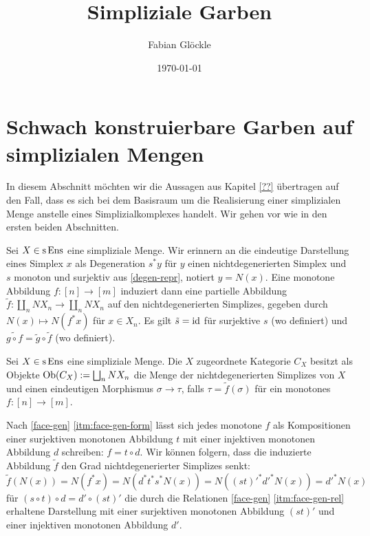 



\title{Simpliziale Garben}
\author{Fabian Glöckle}
\date{\today}

\section{Schwach konstruierbare Garben auf simplizialen Mengen}

In diesem Abschnitt möchten wir die Aussagen aus Kapitel \ref{??}
übertragen auf den Fall, dass es sich bei dem Basisraum um die
Realisierung einer simplizialen Menge anstelle eines
Simplizialkomplexes handelt. Wir gehen vor wie in den ersten beiden
Abschnitten.

Sei $X \in \operatorname{s}\operatorname{Ens}$ eine simpliziale Menge. Wir erinnern an die
eindeutige Darstellung eines Simplex $x$ als Degeneration $s^* y$ für
$y$ einen nichtdegenerierten Simplex und $s$ monoton und surjektiv aus
\ref{degen-repr}, notiert $y = N(x)$. Eine monotone Abbildung $f: [n]
\to [m]$ induziert dann eine partielle Abbildung $\tilde{f}: \coprod_n
NX_n \to \coprod_n NX_n$ auf den nichtdegenerierten Simplizes, gegeben
durch $N(x) \mapsto N(f^* x)$ für $x \in X_n$. Es gilt $\tilde{s} =
\operatorname{id}$ für surjektive $s$ (wo definiert) und $\tilde{g \circ f} =
\tilde{g} \circ \tilde{f}$ (wo definiert).
\begin{defn}
  Sei $X \in \operatorname{s}\operatorname{Ens}$ eine simpliziale Menge. Die $X$ zugeordnete
  Kategorie $C_X$ besitzt als Objekte $\operatorname{Ob}(C_X) := \bigsqcup_n NX_n$ die
  Menge der nichtdegenerierten Simplizes von $X$ und einen eindeutigen
  Morphismus $\sigma \to \tau$, falls $\tau = \tilde{f}(\sigma)$ für
  ein monotones $f: [n] \to [m]$.
\end{defn}
Nach \ref{face-gen} \ref{itm:face-gen-form} lässt sich jedes monotone
$f$ als Kompositionen einer surjektiven monotonen Abbildung $t$ mit
einer injektiven monotonen Abbildung $d$ schreiben: $f = t \circ
d$. Wir können folgern, dass die induzierte Abbildung $\tilde{f}$ den
Grad nichtdegenerierter Simplizes senkt: $\tilde{f}(N(x)) = N(f^* x) =
N(d^* t^* s^* N(x)) = N((st)'^* d'^* N(x)) = d'^* N(x)$ für $(s \circ
t) \circ d = d' \circ (st)'$ die durch die Relationen \ref{face-gen}
\ref{itm:face-gen-rel} erhaltene Darstellung mit einer surjektiven
monotonen Abbildung $(st)'$ und einer injektiven monotonen Abbildung
$d'$.

